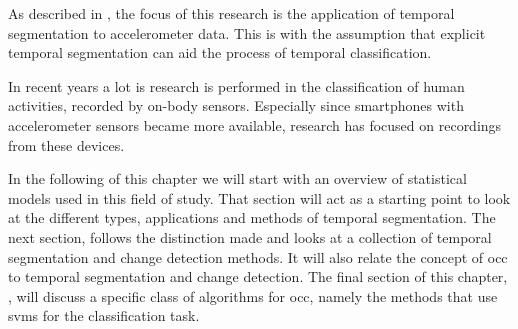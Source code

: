 

As described in , the focus of this research is the application of temporal segmentation to accelerometer data.
This is with the assumption that explicit temporal segmentation can aid the process of temporal classification.

In recent years a lot is research is performed in the classification of human activities, recorded by on-body sensors.
Especially since smartphones with accelerometer sensors became more available, research has focused on recordings from these devices.

In the following of this chapter we will start with an overview of statistical models used in this field of study.
That section will act as a starting point to look at the different types, applications and methods of temporal segmentation.
The next section,  follows the distinction made and looks at a collection of temporal segmentation and change detection methods.
It will also relate the concept of \gls{occ} to temporal segmentation and change detection.
The final section of this chapter, , will discuss a specific class of algorithms for \gls{occ}, namely the methods that use \glspl{svm} for the classification task.


